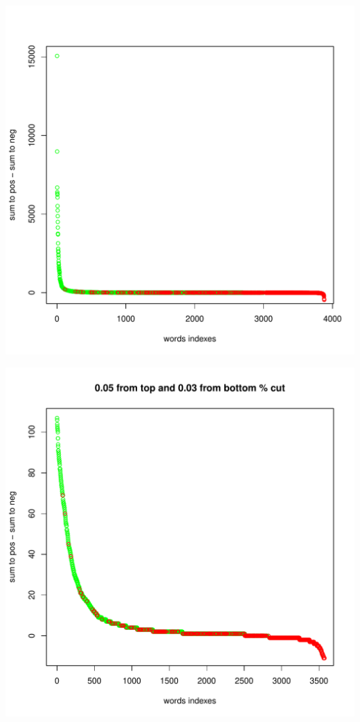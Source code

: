 \documentclass[11pt]{article}\usepackage[]{graphicx}\usepackage[]{color}
\makeatletter
\def\maxwidth{ %
  \ifdim\Gin@nat@width>\linewidth
    \linewidth
  \else
    \Gin@nat@width
  \fi
}
\newenvironment{knitrout}{}{} %
\makeatother
\begin{document}
\begin{knitrout}
\color{fgcolor}
\includegraphics[width=\maxwidth]{figure/unnamed-chunk-71} 

\includegraphics[width=\maxwidth]{figure/unnamed-chunk-72} 


\end{knitrout}
\end{document}
